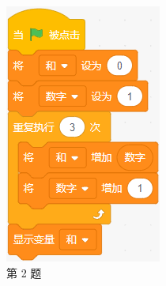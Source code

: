 \documentclass[10pt, a4paper]{article}
\begin{document}
\begin{enumerate}
        \begin{figure}[htbp]
            \centering
            \begin{minipage}[t]{.12\textwidth}
                \centering
                \includegraphics[width=\textwidth]{figure/2.png}
                \caption*{第 2 题}
            \end{minipage}
            \begin{minipage}[t]{.25\textwidth}
                \centering

\end{minipage}
\end{figure}
\end{enumerate}
\end{document}
